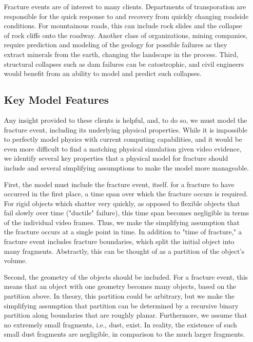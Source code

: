\documentclass[runningheads]{llncs}
\begin{document}
Fracture events are of interest to many clients. Departments of 
transporation are responsible for the quick response to and recovery from 
quickly changing roadside conditions. For mountainous roads, this can include 
rock slides and 
the collapse of rock cliffs onto the roadway. Another class of organizations, 
mining companies, require prediction and modeling of the geology for possible 
failures as they extract 
minerals from the earth, changing the landscape in the process. Third, 
structural collapses such as dam failures 
can be catostrophic, and civil engineers would benefit from 
an ability to model and predict such collapses.

\subsection{Key Model Features}

Any insight provided to these clients is helpful, and, to do so, we must model 
the fracture event, including its underlying physical properties. While 
it is impossible to perfectly model physics with current computing capabilities, 
and it would be even more difficult to find a matching physical simulation given 
video evidence, we identify several key properties that a physical model for 
fracture should include and several simplifying assumptions to make the model 
more manageable.

First, the model must include the fracture event, itself. 
for a fracture to have occurred in the first 
place, a time span over which the fracture occurs is required. For rigid objects which 
shatter very quickly, 
as opposed to flexible objects that fail slowly over time ("ductile" failure), this time 
span becomes negligible in terms of the individual video frames. Thus, we make the 
simplifying assumption that the fracture occurs at a single point in time. In 
addition to "time of fracture," a fracture event includes fracture boundaries, 
which split the initial object into many fragments. Abstractly, this can be 
thought of as a partition of the object's volume.

Second, the geometry of the objects should be included. For a fracture event, 
this means that an object with one geometry becomes many objects, based on the 
partition above. In theory, this partition could be 
arbitrary, but we make the simplifying assumption that partition can be 
determined by a recursive binary partition along boundaries that are roughly 
planar. Furthermore, we assume that no extremely small fragments, i.e., dust, 
exist. In reality, the existence of such small dust fragments are negligible, in 
comparison to the much larger fragments.
\end{document}
